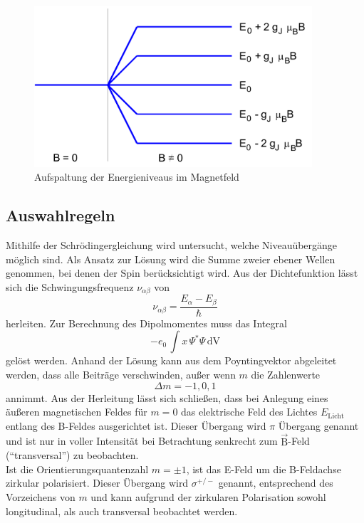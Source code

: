 \begin{figure}
  \centering
  \includegraphics[height=6cm]{./Bilder/ENiveaus.png}
  \caption{Aufspaltung der Energieniveaus im Magnetfeld \cite{V27}}
   \label{fig:Eniv}
\end{figure}

\subsection{Auswahlregeln}
Mithilfe der Schrödingergleichung wird untersucht, welche Niveauübergänge möglich sind. Als Ansatz zur Lösung wird die Summe zweier ebener Wellen genommen, bei denen der Spin berücksichtigt wird. Aus der Dichtefunktion lässt sich die Schwingungsfrequenz $\nu_{\alpha\beta}$ von
\begin{equation}
  \nu_{\alpha\beta}= \frac{E_{\alpha} - E_{\beta}}{\hbar}
  \label{eqn:nu}
\end{equation}
herleiten. Zur Berechnung des Dipolmomentes muss das Integral
\begin{equation}
  -e_0\, \int x \, \Psi^* \Psi \, \text{dV}
\end{equation}
gelöst werden. Anhand der Lösung kann aus dem Poyntingvektor abgeleitet werden, dass alle Beiträge verschwinden, außer wenn $m$ die Zahlenwerte
\begin{equation}
  \Delta m = -1,0,1
\end{equation}
annimmt. Aus der Herleitung lässt sich schließen, dass bei Anlegung eines äußeren magnetischen Feldes für $m = 0$ das elektrische Feld des Lichtes $E_\text{Licht}$ entlang des B-Feldes ausgerichtet ist. Dieser Übergang wird $\pi$ Übergang genannt und ist nur in voller Intensität bei Betrachtung senkrecht zum $\vec{\text{B}}$-Feld (``transversal'') zu beobachten. \\
Ist die Orientierungsquantenzahl $m = \pm 1$, ist das E-Feld um die B-Feldachse zirkular polarisiert. Dieser Übergang wird $\sigma^{+/-}$ genannt, entsprechend des Vorzeichens von $m$ und kann aufgrund der zirkularen Polarisation sowohl longitudinal, als auch transversal beobachtet werden. 

